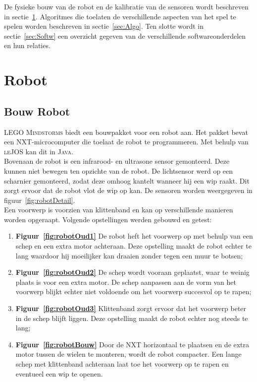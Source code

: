 \documentclass[eind]{penoverslag}
\begin{document}
De fysieke bouw van de robot en de kalibratie van de sensoren wordt beschreven in sectie~\ref{sec:Robot}. Algoritmes die toelaten de verschillende aspecten van het spel te spelen worden beschreven in sectie~\ref{sec:Algo}. Ten slotte wordt in sectie~\ref{sec:Softw} een overzicht gegeven van de verschillende softwareonderdelen en hun relaties.

\section{Robot}
\label{sec:Robot}

\subsection{Bouw Robot}
\label{ssec:Bouw}
\textsc{LEGO Mindstorms} biedt een bouwpakket voor een robot aan. Het pakket bevat een \textsc{NXT}-microcomputer die toelaat de robot te programmeren. Met behulp van \textsc{leJOS} \cite{leJOS} kan dit in \textsc{Java}.\\

Bovenaan de robot is een infrarood- en ultrasone sensor gemonteerd. Deze kunnen niet bewegen ten opzichte van de robot. De lichtsensor werd op een scharnier gemonteerd, zodat deze omhoog kantelt wanneer hij een wip raakt. Dit zorgt ervoor dat de robot vlot de wip op kan. De sensoren worden weergegeven in figuur~\ref{fig:robotDetail}.\\

Een voorwerp is voorzien van klittenband en kan op verschillende manieren worden opgeraapt. Volgende opstellingen werden gebouwd en getest:

\begin{enumerate}
\item \textbf{Figuur~\ref{fig:robotOud1}} De robot heft het voorwerp op met behulp van een schep en een extra motor achteraan. Deze opstelling maakt de robot echter te lang waardoor hij moeilijker kan draaien zonder tegen een muur te botsen;
\item \textbf{Figuur~\ref{fig:robotOud2}} De schep wordt vooraan geplaatst, waar te weinig plaats is voor een extra motor. De schep aanpassen aan de vorm van het voorwerp blijkt echter niet voldoende om het voorwerp succesvol op te rapen;
\item \textbf{Figuur~\ref{fig:robotOud3}} Klittenband zorgt ervoor dat het voorwerp beter in de schep blijft liggen. Deze opstelling maakt de robot echter nog steeds te lang;
\item \textbf{Figuur~\ref{fig:robotBouw}} Door de \textsc{NXT} horizontaal te plaatsen en de extra motor tussen de wielen te monteren, wordt de robot compacter. Een lange schep met klittenband achteraan laat toe het voorwerp op te rapen en eventueel een wip te openen.
\end{enumerate}
\end{document}

